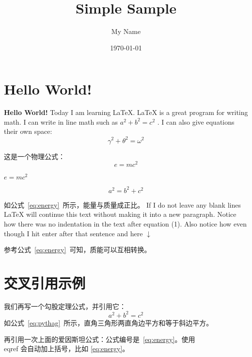 \documentclass{ctexart} %
\title{Simple Sample} %
\author{My Name} %
\date{\today} %
\begin{document}
\maketitle %

\section{Hello World!} %

\textbf{Hello World!} Today I am learning \LaTeX. %
\LaTeX{} is a great program for writing math. I can write in line math such as $a^2+b^2=c^2$ %
. I can also give equations their own space:
\begin{equation} %
  \gamma^2+\theta^2=\omega^2
\end{equation}

这是一个物理公式：
\begin{equation}
  e=mc^2 
  \label{eq:energy}
\end{equation}

$e=mc^2$

$$a^2=b^2+c^2$$

如公式~\eqref{eq:energy}~所示，能量与质量成正比。
If I do not leave any blank lines \LaTeX{} will continue  this text without making it into a new paragraph.  Notice how there was no indentation in the text after equation (1).
Also notice how even though I hit enter after that sentence and here $\downarrow$

参考公式~\eqref{eq:energy}~可知，质能可以互相转换。

\section{交叉引用示例}
我们再写一个勾股定理公式，并引用它：
\begin{equation}
  a^2 + b^2 = c^2 \label{eq:pythag}
\end{equation}
如公式~\eqref{eq:pythag}~所示，直角三角形两直角边平方和等于斜边平方。

再引用一次上面的爱因斯坦公式：公式编号是~\ref{eq:energy}。使用 \\eqref 会自动加上括号，比如 \eqref{eq:energy}。
\end{document}
